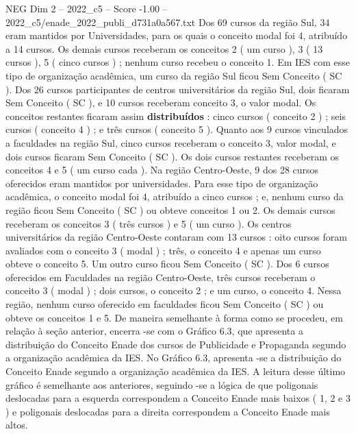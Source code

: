\begin{textsample}{NEG Dim 2 – 2022\_c5 – Score -1.00 – 2022\_c5/enade\_2022\_publi\_d731a0a567.txt}
Dos 69 cursos da região Sul, 34 eram mantidos por Universidades, para os quais o conceito modal foi 4, atribuído a 14 cursos.
Os demais cursos receberam os conceitos 2 ( um curso ), 3 ( 13 cursos ), 5 ( cinco cursos ) ; nenhum curso recebeu o conceito 1.
Em IES com esse tipo de organização acadêmica, um curso da região Sul ficou Sem Conceito ( SC ).
Dos 26 cursos participantes de centros universitários da região Sul, dois ficaram Sem Conceito ( SC ), e 10 cursos receberam conceito 3, o valor modal.
Os conceitos restantes ficaram assim \textbf{distribuídos} : cinco cursos ( conceito 2 ) ; seis cursos ( conceito 4 ) ; e três cursos ( conceito 5 ).
Quanto aos 9 cursos vinculados a faculdades na região Sul, cinco cursos receberam o conceito 3, valor modal, e dois cursos ficaram Sem Conceito ( SC ).
Os dois cursos restantes receberam os conceitos 4 e 5 ( um curso cada ).
Na região Centro-Oeste, 9 dos 28 cursos oferecidos eram mantidos por universidades.
Para esse tipo de organização acadêmica, o conceito modal foi 4, atribuído a cinco cursos ; e, nenhum curso da região ficou Sem Conceito ( SC ) ou obteve conceitos 1 ou 2.
Os demais cursos receberam os conceitos 3 ( três cursos ) e 5 ( um curso ).
Os centros universitários da região Centro-Oeste contaram com 13 cursos : oito cursos foram avaliados com o conceito 3 ( modal ) ; três, o conceito 4 e apenas um curso obteve o conceito 5.
Um outro curso ficou Sem Conceito ( SC ).
Dos 6 cursos oferecidos em Faculdades na região Centro-Oeste, três cursos receberam o conceito 3 ( modal ) ; dois cursos, o conceito 2 ; e um curso, o conceito 4.
Nessa região, nenhum curso oferecido em faculdades ficou Sem Conceito ( SC ) ou obteve os conceitos 1 e 5.
De maneira semelhante à forma como se procedeu, em relação à seção anterior, encerra -se com o Gráfico 6.3, que apresenta a distribuição do Conceito Enade dos cursos de Publicidade e Propaganda segundo a organização acadêmica da IES.
No Gráfico 6.3, apresenta -se a distribuição do Conceito Enade segundo a organização acadêmica da IES.
A leitura desse último gráfico é semelhante aos anteriores, seguindo -se a lógica de que poligonais deslocadas para a esquerda correspondem a Conceito Enade mais baixos ( 1, 2 e 3 ) e poligonais deslocadas para a direita correspondem a Conceito Enade mais altos.

\end{textsample}
